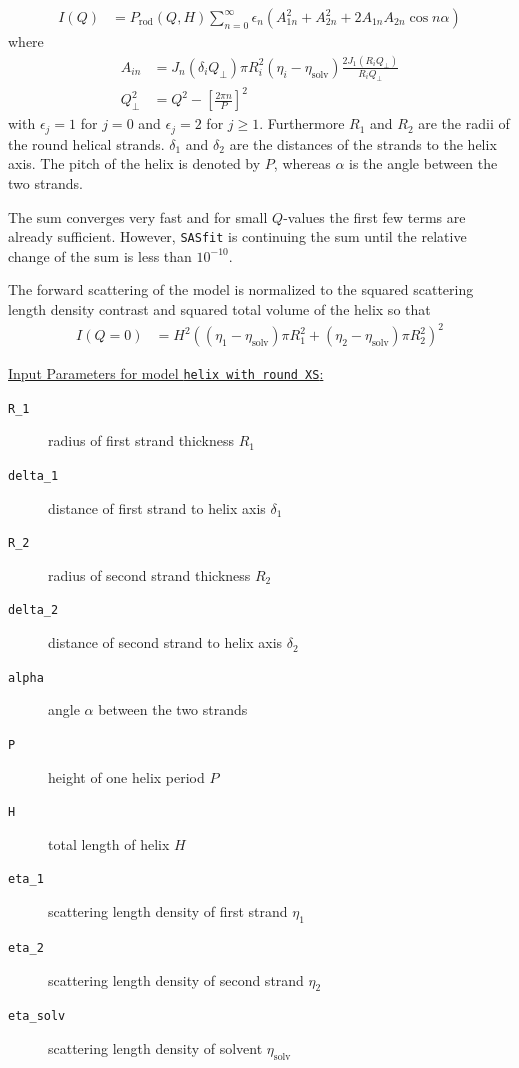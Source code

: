 \begin{align}
I(Q) &= P_\text{rod}(Q,H) \sum_{n=0}^{\infty} \epsilon_n \left( A_{1n}^2 + A_{2n}^2+2A_{1n}A_{2n}\cos n\alpha\right)
\label{eq:roundhelix1}
\end{align}
where
\begin{align}
A_{in} &= J_n\left(\delta_i Q_\perp\right) \pi R_i^2 \left(\eta_i-\eta_\mathrm{solv}\right)\frac{2J_1\left(R_i Q_\perp\right)}{R_i Q_\perp} \\
Q_\perp^2 &= Q^2-\left[\frac{2\pi n}{P}\right]^2
\end{align}
with $\epsilon_j=1$ for $j=0$ and $\epsilon_j=2$ for $j\geq 1$. Furthermore $R_1$ and $R_2$ are the radii of the round helical strands.
$\delta_1$ and $\delta_2$ are the distances of the strands to the helix axis.
The pitch of the helix is denoted by $P$, whereas $\alpha$ is the angle between the two strands.

The sum converges very fast and for small $Q$-values the first few terms are already sufficient. However, {\tt SASfit} is continuing the sum until the relative change of the sum is less than $10^{-10}$.

The forward scattering of the model is normalized to the squared scattering length density contrast and squared total volume of the helix so that
\begin{align}
I(Q=0) &= H^2\left(\left(\eta_\text{1}-\eta_\text{solv}\right)\pi R_1^2+\left(\eta_\text{2}-\eta_\text{solv}\right)\pi R_2^2\right)^2
\end{align}

\vspace{5mm}

\underline{Input Parameters for model \texttt{helix with round XS}:}\\
\begin{description}
\item[\texttt{R\_1}] radius of first strand thickness $R_1$
\item[\texttt{delta\_1}] distance of first strand to helix axis $\delta_1$
\item[\texttt{R\_2}] radius of second strand thickness $R_2$
\item[\texttt{delta\_2}] distance of second strand to helix axis $\delta_2$
\item[\texttt{alpha}] angle $\alpha$ between the two strands
\item[\texttt{P}] height of one helix period $P$
\item[\texttt{H}] total length of helix $H$
\item[\texttt{eta\_1}] scattering length density of first strand $\eta_1$
\item[\texttt{eta\_2}] scattering length density of second strand $\eta_2$
\item[\texttt{eta\_solv}] scattering length density of solvent $\eta_\text{solv}$
\end{description}

